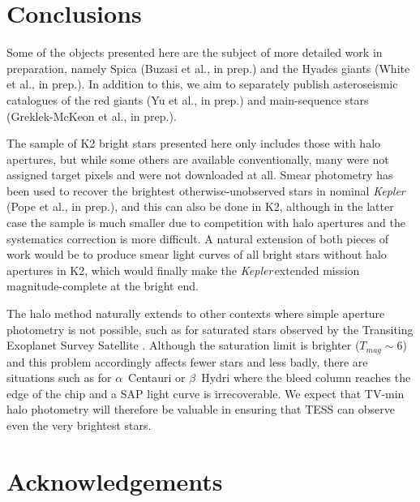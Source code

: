 \documentclass[twocolumn]{aastex62}
\newcommand\kepler{\emph{Kepler}\,}
\begin{document}



\section{Conclusions}
\label{sec:conclusions}


Some of the objects presented here are the subject of more detailed work in preparation, namely Spica (Buzasi et al., in prep.) and the Hyades giants (White et al., in prep.). In addition to this, we aim to separately publish asteroseismic catalogues of the red giants (Yu et al., in prep.) and main-sequence stars (Greklek-McKeon et al., in prep.). 

The sample of K2 bright stars presented here only includes those with halo apertures, but while some others are available conventionally, many were not assigned target pixels and were not downloaded at all. Smear photometry has been used to recover the brightest otherwise-unobserved stars in nominal \kepler (Pope et al., in prep.), and this can also be done in K2, although in the latter case the sample is much smaller due to competition with halo apertures and the systematics correction is more difficult. A natural extension of both pieces of work would be to produce smear light curves of all bright stars without halo apertures in K2, which would finally make the \kepler extended mission magnitude-complete at the bright end. 

The halo method naturally extends to other contexts where simple aperture photometry is not possible, such as for saturated stars observed by the Transiting Exoplanet Survey Satellite \citep[TESS;][]{tess}. Although the saturation limit is brighter ($T_{mag} \sim 6$) and this problem accordingly affects fewer stars and less badly, there are situations such as for $\alpha$~Centauri or $\beta$~Hydri where the bleed column reaches the edge of the chip and a SAP light curve is irrecoverable. We expect that TV-min halo photometry will therefore be valuable in ensuring that TESS can observe even the very brightest stars.

\section*{Acknowledgements} %
\end{document}
